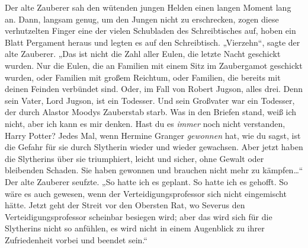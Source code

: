 Der alte Zauberer sah den wütenden jungen Helden einen langen Moment lang an. Dann, langsam genug, um den Jungen nicht zu erschrecken, zogen diese verhutzelten Finger eine der vielen Schubladen des Schreibtisches auf, hoben ein Blatt Pergament heraus und legten es auf den Schreibtisch. „Vierzehn“, sagte der alte Zauberer. „Das ist nicht die Zahl aller Eulen, die letzte Nacht geschickt wurden. Nur die Eulen, die an Familien mit einem Sitz im Zaubergamot geschickt wurden, oder Familien mit großem Reichtum, oder Familien, die bereits mit deinen Feinden verbündet sind. Oder, im Fall von Robert Jugson, alles drei. Denn sein Vater, Lord Jugson, ist ein Todesser. Und sein Großvater war ein Todesser, der durch Alastor Moodys Zauberstab starb. Was in den Briefen stand, weiß ich nicht, aber ich kann es mir denken. Hast du es \emph{immer} noch nicht verstanden, Harry Potter? Jedes Mal, wenn Hermine Granger \emph{gewonnen} hat, wie du sagst, ist die Gefahr für sie durch Slytherin wieder und wieder gewachsen. Aber jetzt haben die Slytherins über sie triumphiert, leicht und sicher, ohne Gewalt oder bleibenden Schaden. Sie haben gewonnen und brauchen nicht mehr zu kämpfen…“ Der alte Zauberer seufzte. „So hatte ich es geplant. So hatte ich es gehofft. So wäre es auch gewesen, wenn der Verteidigungsprofessor sich nicht eingemischt hätte. Jetzt geht der Streit vor den Obersten Rat, wo Severus den Verteidigungsprofessor scheinbar besiegen wird; aber das wird sich für die Slytherins nicht so anfühlen, es wird nicht in einem Augenblick zu ihrer Zufriedenheit vorbei und beendet sein.“

